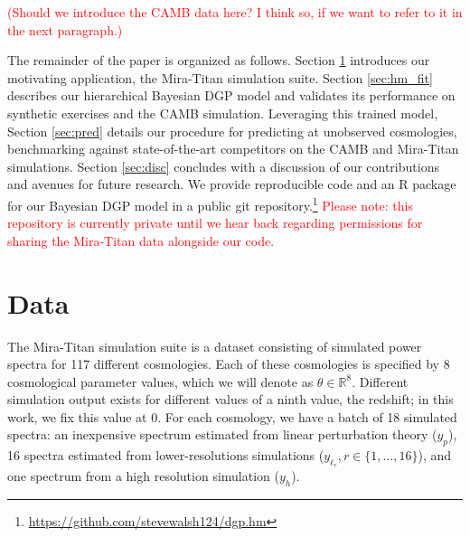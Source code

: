 \documentclass[11pt]{article}
\begin{document}
\textcolor{red}{(Should we introduce the CAMB data here?  I think so, if we
want to refer to it in the next paragraph.)}

The remainder of the paper is organized as follows.  Section \ref{sec:data} 
introduces our motivating application, the Mira-Titan simulation suite.  
Section \ref{sec:hm_fit} describes our hierarchical Bayesian DGP model and 
validates its performance on synthetic exercises and the CAMB simulation.  
Leveraging this trained model, Section \ref{sec:pred} details 
our procedure for predicting at unobserved cosmologies, benchmarking against
state-of-the-art competitors on the CAMB and Mira-Titan simulations. 
Section \ref{sec:disc} concludes with a discussion of our contributions and avenues for future research.  We provide reproducible code and an R package for our Bayesian DGP model
in a public git repository.\footnote{\url{https://github.com/stevewalsh124/dgp.hm}}
\textcolor{red}{Please note: this repository is currently private until we 
hear back regarding permissions for sharing the Mira-Titan data alongside our code.}



\section{Data}
\label{sec:data}

The Mira-Titan simulation suite is a dataset consisting of simulated power spectra for 117 different cosmologies. Each of these cosmologies is specified by 8 cosmological parameter values, which we will denote as $\theta \in \mathbb{R}^8$. Different simulation output exists for different values of a ninth value, the redshift; in this work, we fix this value at 0. For each cosmology, we have a batch of 18 simulated spectra: an inexpensive spectrum estimated from linear perturbation theory ($y_p$), 16 spectra estimated from lower-resolutions simulations ($y_{\ell_r}, r \in \{1,\dots,16\}$), and one spectrum from a high resolution simulation ($y_h$). 
\end{document}
